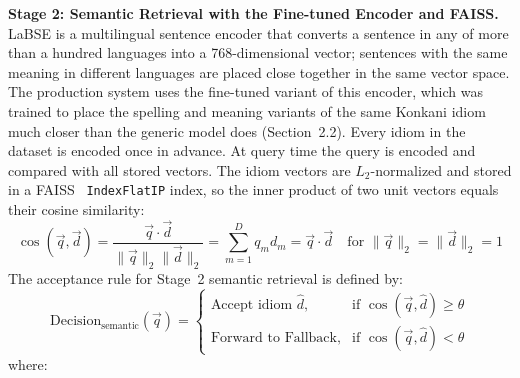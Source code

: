 \documentclass[12pt,a4paper]{article}
\begin{document}
\textbf{Stage 2: Semantic Retrieval with the Fine-tuned Encoder and FAISS.} LaBSE is a multilingual sentence encoder that converts a sentence in any of more than a hundred languages into a 768-dimensional vector; sentences with the same meaning in different languages are placed close together in the same vector space. The production system uses the fine-tuned variant of this encoder, which was trained to place the spelling and meaning variants of the same Konkani idiom much closer than the generic model does (Section~2.2). Every idiom in the dataset is encoded once in advance. At query time the query is encoded and compared with all stored vectors. The idiom vectors are $L_2$-normalized and stored in a FAISS~\cite{faiss} \texttt{IndexFlatIP} index, so the inner product of two unit vectors equals their cosine similarity:
\begin{equation}
\label{eq:cosine_sim}
\cos(\vec{q},\vec{d}) = \frac{\vec{q}\cdot\vec{d}}{\|\vec{q}\|_2 \|\vec{d}\|_2} = \sum_{m=1}^{D} q_m d_m = \vec{q}\cdot\vec{d} \quad \text{for } \|\vec{q}\|_2 = \|\vec{d}\|_2 = 1
\end{equation}
The acceptance rule for Stage~2 semantic retrieval is defined by:
\begin{equation}
\label{eq:semantic_decision}
\mathrm{Decision}_{\mathrm{semantic}}(\vec{q}) = \begin{cases}
\text{Accept idiom } \hat{d}, & \text{if } \cos(\vec{q},\hat{d}) \ge \theta \\
\text{Forward to Fallback}, & \text{if } \cos(\vec{q},\hat{d}) < \theta
\end{cases}
\end{equation}
where:
\end{document}
